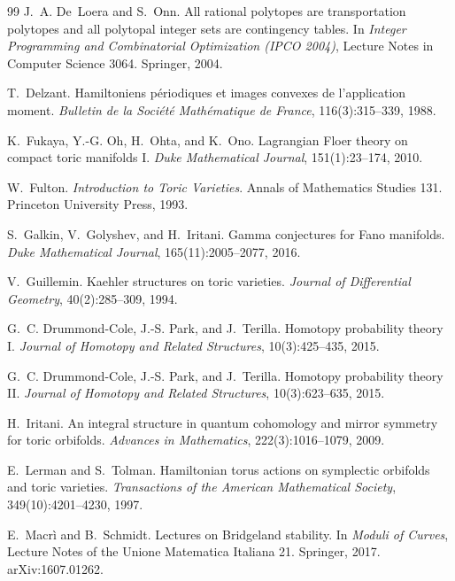 \documentclass[11pt]{article}
\theoremstyle{definition}
\theoremstyle{remark}
\begin{document}
\begin{thebibliography}{99}
J.~A. De~Loera and S.~Onn.
\newblock All rational polytopes are transportation polytopes and all polytopal integer sets are contingency
tables.
\newblock In \emph{Integer Programming and Combinatorial Optimization (IPCO 2004)}, Lecture Notes in Computer
Science 3064. Springer, 2004.

T.~Delzant.
\newblock Hamiltoniens p\'eriodiques et images convexes de l'application moment.
\newblock \emph{Bulletin de la Soci\'et\'e Math\'ematique de France}, 116(3):315--339, 1988.

K.~Fukaya, Y.-G. Oh, H.~Ohta, and K.~Ono.
\newblock Lagrangian {F}loer theory on compact toric manifolds {I}.
\newblock \emph{Duke Mathematical Journal}, 151(1):23--174, 2010.

W.~Fulton.
\newblock \emph{Introduction to Toric Varieties}.
\newblock Annals of Mathematics Studies 131. Princeton University Press, 1993.

S.~Galkin, V.~Golyshev, and H.~Iritani.
\newblock Gamma conjectures for {F}ano manifolds.
\newblock \emph{Duke Mathematical Journal}, 165(11):2005--2077, 2016.

V.~Guillemin.
\newblock Kaehler structures on toric varieties.
\newblock \emph{Journal of Differential Geometry}, 40(2):285--309, 1994.

G.~C. Drummond-Cole, J.-S. Park, and J.~Terilla.
\newblock Homotopy probability theory {I}.
\newblock \emph{Journal of Homotopy and Related Structures}, 10(3):425--435, 2015.

G.~C. Drummond-Cole, J.-S. Park, and J.~Terilla.
\newblock Homotopy probability theory {II}.
\newblock \emph{Journal of Homotopy and Related Structures}, 10(3):623--635, 2015.

H.~Iritani.
\newblock An integral structure in quantum cohomology and mirror symmetry for toric orbifolds.
\newblock \emph{Advances in Mathematics}, 222(3):1016--1079, 2009.

E.~Lerman and S.~Tolman.
\newblock Hamiltonian torus actions on symplectic orbifolds and toric varieties.
\newblock \emph{Transactions of the American Mathematical Society}, 349(10):4201--4230, 1997.

E.~Macr\`i and B.~Schmidt.
\newblock Lectures on {B}ridgeland stability.
\newblock In \emph{Moduli of Curves}, Lecture Notes of the Unione Matematica Italiana 21. Springer,
2017. arXiv:1607.01262.


\end{thebibliography}
\end{document}
